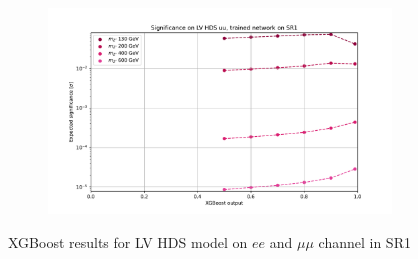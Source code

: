 \documentclass[12pt, a4paper]{book}
\begin{document}
\begin{figure}[!ht]
\begin{subfigure}[b]{0.49\textwidth}
   \end{subfigure}
   \hfill
   \begin{subfigure}[b]{0.49\textwidth}
      \centering
      \includegraphics[width=1\textwidth]{XGBoost/Model_independent/50-100/LV_HDS/EXP_SIG_uu.pdf}
   \end{subfigure}
   \caption{XGBoost results for LV HDS model on $ee$ and $\mu\mu$ channel in SR1}\label{fig:LV_HDS_SR1}
\end{figure}
\end{document}
